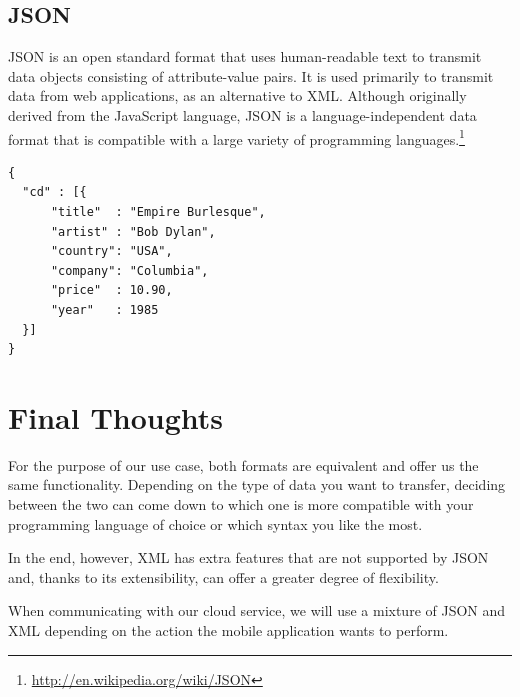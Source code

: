 \subsection{JSON}

\ac{JSON} is an open standard format that uses human-readable text to transmit data objects consisting of attribute-value pairs. It is used primarily to transmit data from web applications, as an alternative to XML. Although originally derived from the JavaScript language, JSON is a language-independent data format that is compatible with a large variety of programming languages.\footnote{\url{http://en.wikipedia.org/wiki/JSON}}

\begin{lstlisting}[frame=lt,caption=A JSON example]
{ 
  "cd" : [{
      "title"  : "Empire Burlesque",
      "artist" : "Bob Dylan",
      "country": "USA",
      "company": "Columbia",
      "price"  : 10.90,
      "year"   : 1985
  }]
}
\end{lstlisting}

\section{Final Thoughts}

For the purpose of our use case, both formats are equivalent and offer us the same functionality. Depending on the type of data you want to transfer, deciding between the two can come down to which one is more compatible with your programming language of choice or which syntax you like the most. 

In the end, however, \ac{XML} has extra features that are not supported by \ac{JSON} and, thanks to its extensibility, can offer a greater degree of flexibility.

When communicating with our cloud service, we will use a mixture of \ac{JSON} and \ac{XML} depending on the action the mobile application wants to perform. 



   
  




 
  